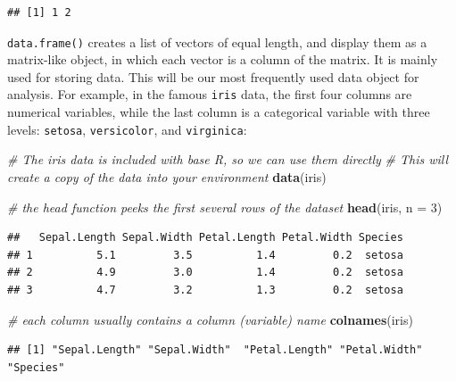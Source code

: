 \documentclass[
]{book}
\newenvironment{Shaded}{\begin{snugshade}}{\end{snugshade}}
\newcommand{\CommentTok}[1]{\textcolor[rgb]{0.56,0.35,0.01}{\textit{#1}}}
\newcommand{\DataTypeTok}[1]{\textcolor[rgb]{0.13,0.29,0.53}{#1}}
\newcommand{\DecValTok}[1]{\textcolor[rgb]{0.00,0.00,0.81}{#1}}
\newcommand{\KeywordTok}[1]{\textcolor[rgb]{0.13,0.29,0.53}{\textbf{#1}}}
\newcommand{\NormalTok}[1]{#1}
\newcommand{\OperatorTok}[1]{\textcolor[rgb]{0.81,0.36,0.00}{\textbf{#1}}}
\begin{document}
\begin{verbatim}
## [1] 1 2
\end{verbatim}

\texttt{data.frame()} creates a list of vectors of equal length, and display them as a matrix-like object, in which each vector is a column of the matrix. It is mainly used for storing data. This will be our most frequently used data object for analysis. For example, in the famous \texttt{iris} data, the first four columns are numerical variables, while the last column is a categorical variable with three levels: \texttt{setosa}, \texttt{versicolor}, and \texttt{virginica}:

\begin{Shaded}
\begin{Highlighting}[]
  \CommentTok{# The iris data is included with base R, so we can use them directly}
  \CommentTok{# This will create a copy of the data into your environment}
  \KeywordTok{data}\NormalTok{(iris)}

  \CommentTok{# the head function peeks the first several rows of the dataset }
  \KeywordTok{head}\NormalTok{(iris, }\DataTypeTok{n =} \DecValTok{3}\NormalTok{)}
\end{Highlighting}
\end{Shaded}

\begin{verbatim}
##   Sepal.Length Sepal.Width Petal.Length Petal.Width Species
## 1          5.1         3.5          1.4         0.2  setosa
## 2          4.9         3.0          1.4         0.2  setosa
## 3          4.7         3.2          1.3         0.2  setosa
\end{verbatim}

\begin{Shaded}
\begin{Highlighting}[]
  \CommentTok{# each column usually contains a column (variable) name }
  \KeywordTok{colnames}\NormalTok{(iris)}
\end{Highlighting}
\end{Shaded}

\begin{verbatim}
## [1] "Sepal.Length" "Sepal.Width"  "Petal.Length" "Petal.Width"  "Species"
\end{verbatim}

\begin{Shaded}
\end{Shaded}
\end{document}
